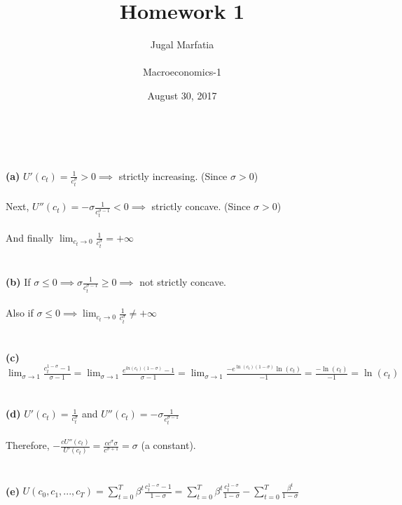 \documentclass[11zpt]{article}
\title{Homework 1}
\author{Jugal Marfatia \\ \\Macroeconomics-1 \\ }
\date{August 30, 2017}
\newenvironment{problem}[2][Problem]{\begin{trivlist}
\item[\hskip \labelsep {\bfseries #1}\hskip \labelsep {\bfseries #2.}]}{\end{trivlist}}
\begin{document}
\maketitle

 
\begin{problem}{1}. \\ \\
\textbf{(a)} $  U'(c_t) = \frac{1}{c_t^\sigma} > 0 \implies $ strictly increasing. (Since $\sigma > 0 $)
\\
\\
Next, $U''(c_t) =-\sigma \frac{1}{c_t^{\sigma-1}} < 0 \implies $ strictly concave. (Since $\sigma > 0 $)
\\
\\And finally $ \lim_{c_t \to 0} \frac{1}{c_t^\sigma} = + \infty$
\\
\\
\\
\textbf{(b)} If $\sigma \leq 0 \implies \sigma \frac{1}{c_t^{\sigma-1}} \geq 0 \implies $ not strictly concave.
\\
\\
Also if $\sigma \leq 0 \implies  \lim_{c_t \to 0} \frac{1}{c_t^\sigma} \neq + \infty$ 
\\
\\
\\
\textbf{(c)} $\lim_{\sigma \to 1} \frac{c_t^{1-\sigma}- 1}{\sigma - 1} = \lim_{\sigma \to 1} \frac{e^{ln(c_t){(1-\sigma)}}- 1}{\sigma - 1} = \lim_{\sigma \to 1} \frac{- e^{\ln(c_t){(1-\sigma)}}\ln(c_t)}{- 1} = \frac{- \ln(c_t)}{- 1} = \ln(c_t)$ 
\\
\\
\\
\textbf{(d)} $U'(c_t) = \frac{1}{c_t^\sigma} $ and $U''(c_t) =-\sigma \frac{1}{c_t^{\sigma-1}} $
\\
\\
Therefore, $ -\frac{c U''(c_t)}{U'(c_t)} = \frac{c c^{\sigma}\sigma}{c^{\sigma+1}} = \sigma $ (a constant). 
\\
\\
\\
\textbf{(e)} $U(c_0, c_1, ..., c_T) = \sum_{t=0}^{T} \beta^t  \frac{c_t^{1- \sigma} - 1}{1-\sigma} = \sum_{t=0}^{T} \beta^t  \frac{c_t^{1- \sigma}}{1-\sigma} - \sum_{t=0}^{T}  \frac{\beta^t }{1-\sigma} $
\\
\\
\\

\end{problem}
\end{document}
